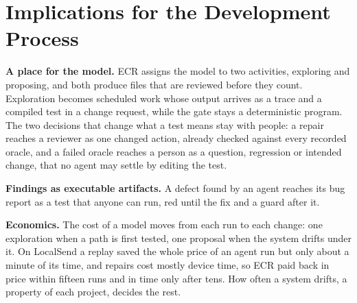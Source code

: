\section{Implications for the Development Process}
\label{sec:implications}

\textbf{A place for the model.} ECR assigns the model to two activities, exploring and proposing, and both produce files that are reviewed before they count. Exploration becomes scheduled work whose output arrives as a trace and a compiled test in a change request, while the gate stays a deterministic program. The two decisions that change what a test means stay with people: a repair reaches a reviewer as one changed action, already checked against every recorded oracle, and a failed oracle reaches a person as a question, regression or intended change, that no agent may settle by editing the test.

\textbf{Findings as executable artifacts.} A defect found by an agent reaches its bug report as a test that anyone can run, red until the fix and a guard after it.

\textbf{Economics.} The cost of a model moves from each run to each change: one exploration when a path is first tested, one proposal when the system drifts under it. On LocalSend a replay saved the whole price of an agent run but only about a minute of its time, and repairs cost mostly device time, so ECR paid back in price within fifteen runs and in time only after tens. How often a system drifts, a property of each project, decides the rest.
